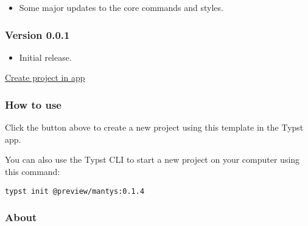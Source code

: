 \begin{itemize}
\tightlist
\item
  Some major updates to the core commands and styles.
\end{itemize}

\subsubsection{Version 0.0.1}\label{version-0.0.1}

\begin{itemize}
\tightlist
\item
  Initial release.
\end{itemize}

\href{/app?template=mantys&version=0.1.4}{Create project in app}

\subsubsection{How to use}\label{how-to-use}

Click the button above to create a new project using this template in
the Typst app.

You can also use the Typst CLI to start a new project on your computer
using this command:

\begin{verbatim}
typst init @preview/mantys:0.1.4
\end{verbatim}



\subsubsection{About}\label{about}

